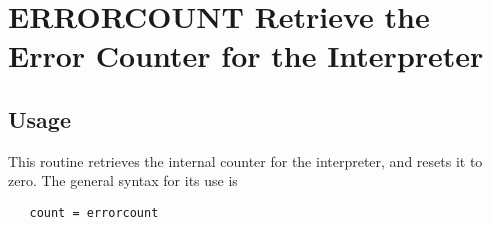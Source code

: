 \section{ERRORCOUNT Retrieve the Error Counter for the Interpreter}

\subsection{Usage}

This routine retrieves the internal counter for the interpreter,
and resets it to zero.  The general syntax for its use is
\begin{verbatim}
   count = errorcount
\end{verbatim}
